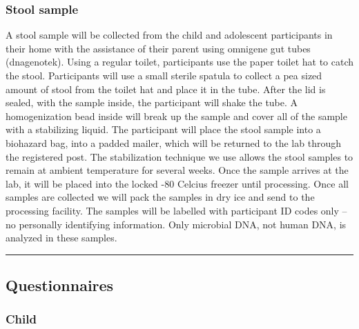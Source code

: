 \documentclass[]{book}
\begin{document}
\hypertarget{stool-sample}{%
\subsubsection{Stool sample}\label{stool-sample}}

A stool sample will be collected from the child and adolescent participants in their home with the assistance of their parent using omnigene gut tubes (dnagenotek). Using a regular toilet, participants use the paper toilet hat to catch the stool. Participants will use a small sterile spatula to collect a pea sized amount of stool from the toilet hat and place it in the tube. After the lid is sealed, with the sample inside, the participant will shake the tube. A homogenization bead inside will break up the sample and cover all of the sample with a stabilizing liquid. The participant will place the stool sample into a biohazard bag, into a padded mailer, which will be returned to the lab through the registered post. The stabilization technique we use allows the stool samples to remain at ambient temperature for several weeks. Once the sample arrives at the lab, it will be placed into the locked -80 Celcius freezer until processing. Once all samples are collected we will pack the samples in dry ice and send to the processing facility. The samples will be labelled with participant ID codes only -- no personally identifying information. Only microbial DNA, not human DNA, is analyzed in these samples.

\begin{center}\rule{0.5\linewidth}{0.5pt}\end{center}

\hypertarget{questionnaires}{%
\subsection{Questionnaires}\label{questionnaires}}

\hypertarget{child}{%
\subsubsection{Child}\label{child}}
\end{document}
